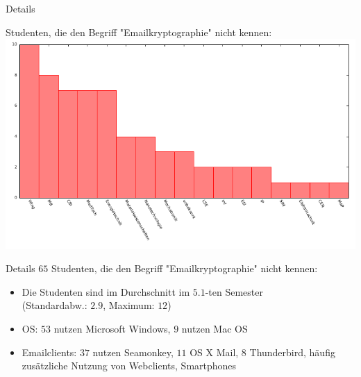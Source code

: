 \documentclass[]{beamer}
\begin{document}
\begin{frame}{Details}
	\begin{center}
	Studenten, die den Begriff "Emailkryptographie" nicht kennen:
	\includegraphics[scale=0.9]{plots/emailkryptunbek.pdf}
\end{center}
\end{frame}
\begin{frame}{Details}
	$65$ Studenten, die den Begriff "Emailkryptographie" nicht kennen:
	\begin{itemize}
		\item Die Studenten sind im Durchschnitt im $5.1$-ten Semester\\ (Standardabw.: $2.9$, Maximum: $12$)
		\item<2-> OS: $53$ nutzen Microsoft Windows, $9$ nutzen Mac OS
		\item<3-> Emailclients: $37$ nutzen Seamonkey, $11$ OS X Mail, $8$ Thunderbird, häufig zusätzliche Nutzung von Webclients, Smartphones
	\end{itemize}
\end{frame}
\end{document}

